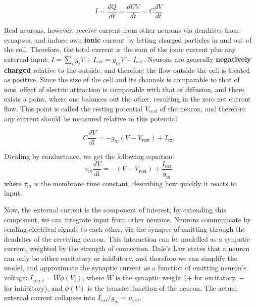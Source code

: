 \documentclass[10pt,twocolumn]{article}
\begin{document}
\begin{equation}
    I = \frac{dQ}{dt} = \frac{dCV}{dt} = C \frac{dV}{dt}
\end{equation}

Real neurons, however, receive current from other neurons via dendrites from synapses,
and induce own \textbf{ionic} current by
letting charged particles
in and out of the cell. Therefore,
the total current is the sum of the ionic current plus any external input: $I = \sum_{i}g_iV + I_{ext} = g_mV + I_{ext}$.
Neurons are generally \textbf{negatively charged} relative to the outside, and therefore the flow outside the cell is treated as positive.
Since the size of the cell and its channels is comparable to that of ions, effect of electric attraction is comparable with that of diffusion,
and there exists a point, where one balances out the other, resulting in the zero net current flow.
This point is called the resting potential $V_{rest}$ of the neuron, and therefore any current should be measured relative to this potential.

\begin{equation}
    C \frac{dV}{dt} = -g_m(V - V_{\text{rest}}) + I_{\text{ext}}
\end{equation}

Dividing by conductance, we get the following equation:
\begin{equation}
    \tau_m \frac{dV}{dt} = -(V - V_{\text{rest}}) + \frac{I_{\text{ext}}}{g_m}
\end{equation}
where $\tau_m$ is the membrane time constant, describing how quickly it reacts to input.

Now, the external current is the component of interest,
by extending this component, we can integrate input from other neurons.
Neurons communicate by sending electrical signals to each other, via the synapse of
emitting through the dendrites of the receiving neuron.
This interaction can be modelled as a synpatic current, weighted by the strength of connection.
Dale's Law\cite{efron1968psychopharmacology} states that a neuron can only be
either excitatory or inhibitory, and therefore we can simplify the model, and
approximate the synaptic current as a function of emitting neuron's voltage:
$I_{\text{syn},i} = W\phi(V_i)$,
where $W$ is the synaptic weight ($+$ for excitatory, $-$ for inhibitory), and $\phi(V)$ is the transfer function of the neuron.
The actual external current collapses into $I_{ext}/g_m=u_{ext}$.
\end{document}
